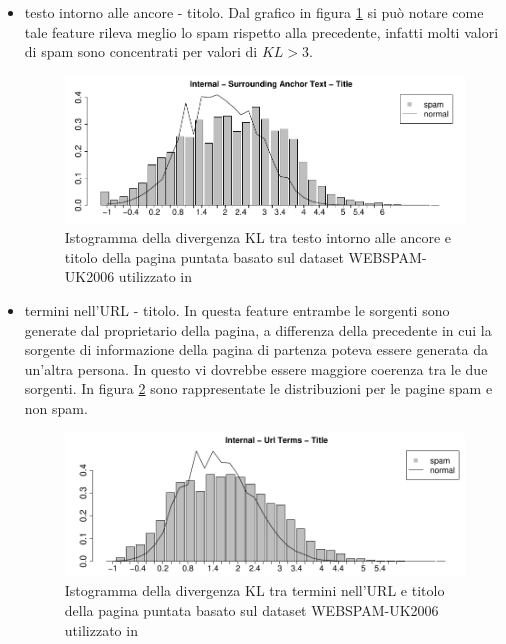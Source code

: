 \begin{itemize}
\item testo intorno alle ancore - titolo. Dal grafico in figura \ref{fig:martinez5} si può notare come tale feature rileva meglio lo spam rispetto alla precedente, infatti molti valori di spam sono concentrati per valori di \(KL > 3\).
\begin{figure}[htbp]
\centering
\includegraphics[width=12cm]{immagini/martinez/martinez5}
\caption{Istogramma della divergenza KL tra testo intorno alle ancore e titolo della pagina puntata basato sul dataset WEBSPAM-UK2006 utilizzato in \cite{Martinez-Romo:2009:WSI:1531914.1531920}}
\label{fig:martinez5}
\end{figure}

\item termini nell'URL - titolo. In questa feature entrambe le sorgenti sono generate dal proprietario della pagina, a differenza della precedente in cui la sorgente di  informazione della pagina di partenza poteva essere generata da un'altra persona. In questo vi dovrebbe essere maggiore coerenza tra le due sorgenti. In figura \ref{fig:martinez6} sono rappresentate le distribuzioni per le pagine spam e non spam.
\begin{figure}[htbp]
\centering
\includegraphics[width=12cm]{immagini/martinez/martinez6}
\caption{Istogramma della divergenza KL tra termini nell'URL e titolo della pagina puntata basato sul dataset WEBSPAM-UK2006 utilizzato in \cite{Martinez-Romo:2009:WSI:1531914.1531920}}
\label{fig:martinez6}
\end{figure}


\end{itemize}
